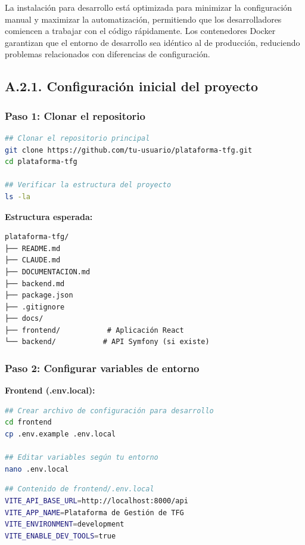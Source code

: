\documentclass[12pt,a4paper,oneside]{report}
\begin{document}
La instalación para desarrollo está optimizada para minimizar la configuración manual y maximizar la automatización, permitiendo que los desarrolladores comiencen a trabajar con el código rápidamente. Los contenedores Docker garantizan que el entorno de desarrollo sea idéntico al de producción, reduciendo problemas relacionados con diferencias de configuración.

\subsection{A.2.1. Configuración inicial del
proyecto}\label{a.2.1.-configuraciuxf3n-inicial-del-proyecto}

\subsubsection{Paso 1: Clonar el
repositorio}\label{paso-1-clonar-el-repositorio}

\begin{lstlisting}[language=bash]
## Clonar el repositorio principal
git clone https://github.com/tu-usuario/plataforma-tfg.git
cd plataforma-tfg

## Verificar la estructura del proyecto
ls -la
\end{lstlisting}

\textbf{Estructura esperada:}

\begin{lstlisting}
plataforma-tfg/
├── README.md
├── CLAUDE.md
├── DOCUMENTACION.md
├── backend.md
├── package.json
├── .gitignore
├── docs/
├── frontend/           # Aplicación React
└── backend/           # API Symfony (si existe)
\end{lstlisting}

\subsubsection{Paso 2: Configurar variables de
entorno}\label{paso-2-configurar-variables-de-entorno}

\textbf{Frontend (.env.local):}

\begin{lstlisting}[language=bash]
## Crear archivo de configuración para desarrollo
cd frontend
cp .env.example .env.local

## Editar variables según tu entorno
nano .env.local
\end{lstlisting}

\begin{lstlisting}[language=bash]
## Contenido de frontend/.env.local
VITE_API_BASE_URL=http://localhost:8000/api
VITE_APP_NAME=Plataforma de Gestión de TFG
VITE_ENVIRONMENT=development
VITE_ENABLE_DEV_TOOLS=true
\end{lstlisting}
\end{document}
